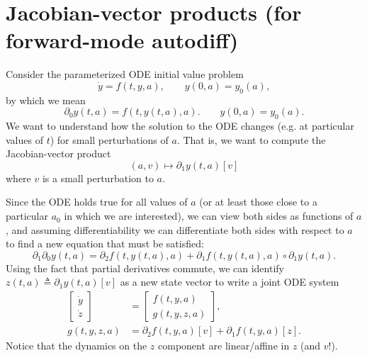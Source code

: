 \documentclass{article}
\begin{document}
\section{Jacobian-vector products (for forward-mode autodiff)}
Consider the parameterized ODE initial value problem
\begin{equation}
    \dot y = f(t, y, a), \qquad y(0, a) = y_0(a),
\end{equation}
by which we mean
\begin{equation}
    \partial_0 y(t, a) = f(t, y(t, a), a). \qquad y(0, a) = y_0(a).
\end{equation}
We want to understand how the solution to the ODE changes (e.g. at particular
values of $t$) for small perturbations of $a$. That is, we want to compute the
Jacobian-vector product
\begin{equation}
    (a, v) \mapsto \partial_1 y(t, a)[v]
\end{equation}
where $v$ is a small perturbation to $a$.

Since the ODE holds true for all values of $a$ (or at least those close to a
particular $a_0$ in which we are interested), we can view both sides as
functions of $a$, and assuming differentiability we can differentiate both
sides with respect to $a$ to find a new equation that must be satisfied:
\begin{equation}
    \partial_1 \partial_0 y(t, a) = \partial_2 f(t, y(t, a), a) + \partial_1 f(t, y(t, a), a) \circ \partial_1 y(t, a).
\end{equation}
Using the fact that partial derivatives commute, we can identify $z(t, a)
\triangleq \partial_1 y(t, a)[v]$ as a new state vector to write a joint ODE system
\begin{align*}
    \begin{bmatrix}
        \dot y \\
        \dot z
    \end{bmatrix}
    &=
    \begin{bmatrix}
        f(t, y, a) \\
        g(t, y, z, a)
    \end{bmatrix},
    \\
    g(t, y, z, a) &= \partial_2 f(t, y, a)[v] + \partial_1 f(t, y, a)[z].
\end{align*}
Notice that the dynamics on the $z$ component are linear/affine in $z$ (and $v$!).

\end{document}
